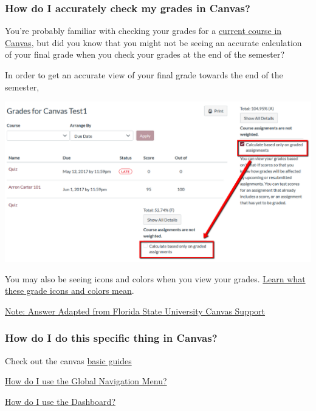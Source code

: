\documentclass[
]{book}
\begin{document}
\hypertarget{how-do-i-accurately-check-my-grades-in-canvas}{%
\subsubsection{How do I accurately check my grades in Canvas?}\label{how-do-i-accurately-check-my-grades-in-canvas}}

You're probably familiar with checking your grades for a \href{https://community.canvaslms.com/t5/Student-Guide/How-do-I-view-my-grades-in-a-current-course/ta-p/493}{current course in Canvas}, but did you know that you might not be seeing an accurate calculation of your final grade when you check your grades at the end of the semester?

In order to get an accurate view of your final grade towards the end of the semester,

\begin{center}\includegraphics[width=0.5\linewidth]{img/grades} \end{center}

You may also be seeing icons and colors when you view your grades. \href{https://community.canvaslms.com/docs/DOC-16533-4212829283}{Learn what these grade icons and colors mean}.

\href{https://support.canvas.fsu.edu/kb/article/1068-students-make-sure-you-are-seeing-the-right-grades-in-canvas/}{Note: Answer Adapted from Florida State University Canvas Support}

\hypertarget{how-do-i-do-this-specific-thing-in-canvas}{%
\subsubsection{How do I do this specific thing in Canvas?}\label{how-do-i-do-this-specific-thing-in-canvas}}

Check out the canvas \href{https://community.canvaslms.com/t5/Canvas-Basics-Guide/tkb-p/basics}{basic guides}

\href{https://community.canvaslms.com/docs/DOC-10603-4212710332}{How do I use the Global Navigation Menu?}

\href{https://community.canvaslms.com/docs/DOC-10587-4212710330}{How do I use the Dashboard?}
\end{document}
